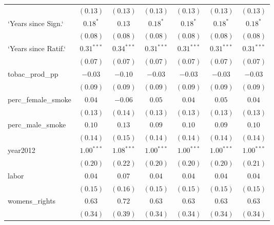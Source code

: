 \begin{table}[!h]
\begin{center}
\begin{tabular}{l c c c c c c }
                        & $(0.13)$     & $(0.13)$     & $(0.13)$     & $(0.13)$     & $(0.13)$     & $(0.13)$     \\
`Years since Sign.`     & $0.18^{*}$   & $0.13$       & $0.18^{*}$   & $0.18^{*}$   & $0.18^{*}$   & $0.18^{*}$   \\
                        & $(0.08)$     & $(0.08)$     & $(0.08)$     & $(0.08)$     & $(0.08)$     & $(0.08)$     \\
`Years since Ratif.`    & $0.31^{***}$ & $0.34^{***}$ & $0.31^{***}$ & $0.31^{***}$ & $0.31^{***}$ & $0.31^{***}$ \\
                        & $(0.07)$     & $(0.07)$     & $(0.07)$     & $(0.07)$     & $(0.07)$     & $(0.07)$     \\
tobac\_prod\_pp         & $-0.03$      & $-0.10$      & $-0.03$      & $-0.03$      & $-0.03$      & $-0.03$      \\
                        & $(0.09)$     & $(0.09)$     & $(0.09)$     & $(0.09)$     & $(0.09)$     & $(0.09)$     \\
perc\_female\_smoke     & $0.04$       & $-0.06$      & $0.05$       & $0.04$       & $0.05$       & $0.04$       \\
                        & $(0.13)$     & $(0.14)$     & $(0.13)$     & $(0.13)$     & $(0.13)$     & $(0.13)$     \\
perc\_male\_smoke       & $0.10$       & $0.13$       & $0.09$       & $0.10$       & $0.09$       & $0.10$       \\
                        & $(0.14)$     & $(0.15)$     & $(0.14)$     & $(0.14)$     & $(0.14)$     & $(0.14)$     \\
year2012                & $1.00^{***}$ & $1.08^{***}$ & $1.00^{***}$ & $1.00^{***}$ & $1.00^{***}$ & $1.00^{***}$ \\
                        & $(0.20)$     & $(0.22)$     & $(0.20)$     & $(0.20)$     & $(0.20)$     & $(0.21)$     \\
labor                   & $0.04$       & $0.07$       & $0.04$       & $0.04$       & $0.04$       & $0.04$       \\
                        & $(0.15)$     & $(0.16)$     & $(0.15)$     & $(0.15)$     & $(0.15)$     & $(0.15)$     \\
womens\_rights          & $0.63$       & $0.72$       & $0.63$       & $0.63$       & $0.63$       & $0.63$       \\
                        & $(0.34)$     & $(0.39)$     & $(0.34)$     & $(0.34)$     & $(0.34)$     & $(0.34)$     \\

\end{tabular}
\end{center}
\end{table}
